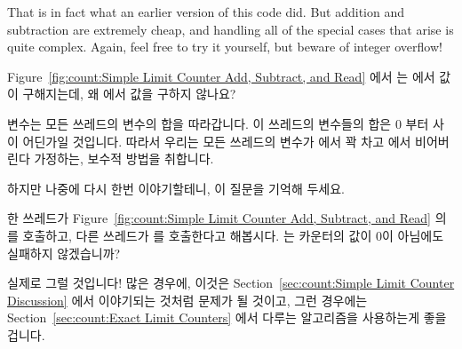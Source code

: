 \begin{enumerate}
	That is in fact what an earlier version of this code did.
	But addition and subtraction are extremely cheap, and handling
	all of the special cases that arise is quite complex.
	Again, feel free to try it yourself, but beware of integer
	overflow!
	\fi

\QuickQ{}
	Figure~\ref{fig:count:Simple Limit Counter Add, Subtract, and Read}
	에서  는  에서 값이 구해지는데, 왜
	 에서 값을 구하지 않나요?

\QuickA{}
	 변수는 모든 쓰레드의  변수의 합을
	따라갑니다.
	이 쓰레드의  변수들의 합은 0 부터  사이
	어딘가일 것입니다.
	따라서 우리는 모든 쓰레드의  변수가  에서
	꽉 차고  에서 비어버린다 가정하는, 보수적 방법을
	취합니다.

	하지만 나중에 다시 한번 이야기할테니, 이 질문을 기억해 두세요.

\QuickQ{}
	한 쓰레드가 Figure~\ref{fig:count:Simple Limit Counter Add, Subtract,
	and Read} 의  를 호출하고, 다른 쓰레드가
	 를 호출한다고 해봅시다.
	 는 카운터의 값이 0이 아님에도 실패하지 않겠습니까?

\QuickA{}
	실제로 그럴 것입니다!
	많은 경우에, 이것은 Section~\ref{sec:count:Simple Limit Counter
	Discussion} 에서 이야기되는 것처럼 문제가 될 것이고, 그런 경우에는
	Section~\ref{sec:count:Exact Limit Counters} 에서 다루는 알고리즘을
	사용하는게 좋을 겁니다.
	\iffalse


\end{enumerate}
